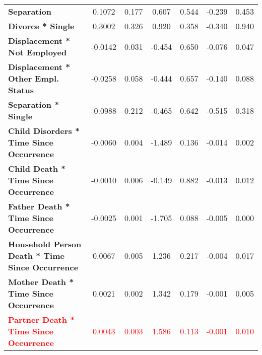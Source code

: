 \begin{center}
\begin{tabular}{lcccccc}
 \textbf{Separation}                                                                                 &       0.1072  &        0.177     &     0.607  &         0.544        &       -0.239    &        0.453     \\
 \textbf{Divorce * Single}                                                     &       0.3002  &        0.326     &     0.920  &         0.358        &       -0.340    &        0.940     \\
 \textbf{Displacement * Not Employed}                                    &      -0.0142  &        0.031     &    -0.454  &         0.650        &       -0.076    &        0.047     \\
 \textbf{Displacement * Other Empl. Status}                                           &      -0.0258  &        0.058     &    -0.444  &         0.657        &       -0.140    &        0.088     \\
 \textbf{Separation * Single}                                                    &      -0.0988  &        0.212     &    -0.465  &         0.642        &       -0.515    &        0.318     \\
 \textbf{Child Disorders * Time Since Occurrence}                                          &      -0.0060  &        0.004     &    -1.489  &         0.136        &       -0.014    &        0.002     \\
 \textbf{Child Death * Time Since Occurrence}                                                &      -0.0010  &        0.006     &    -0.149  &         0.882        &       -0.013    &        0.012     \\
 \textbf{Father Death * Time Since Occurrence}                                              &      -0.0025  &        0.001     &    -1.705  &         0.088        &       -0.005    &        0.000     \\
 \textbf{Household Person Death * Time Since Occurrence}                                      &       0.0067  &        0.005     &     1.236  &         0.217        &       -0.004    &        0.017     \\
 \textbf{Mother Death * Time Since Occurrence}                                              &       0.0021  &        0.002     &     1.342  &         0.179        &       -0.001    &        0.005     \\
 \textcolor{red}{\textbf{Partner Death * Time Since Occurrence}}                                            &       \textcolor{red}{0.0043}  &        \textcolor{red}{0.003}     &     \textcolor{red}{1.586}  &         \textcolor{red}{0.113}        &       \textcolor{red}{-0.001}    &        \textcolor{red}{0.010}     \\

\end{tabular}
\end{center}
